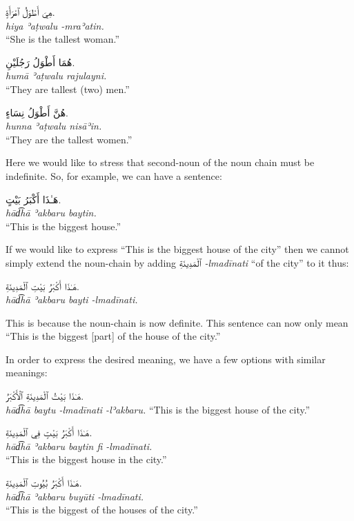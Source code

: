 \documentclass[
  10pt,
]{book}
\begin{document}
\foreignlanguage{arabic}{هِيَ أَطْوَلُ ٱمْرَأَةٍ.}\\
\emph{hiya ʾaṭwalu -mraʾatin.}\\
\enquote{She is the tallest woman.}

\foreignlanguage{arabic}{هُمَا أَطْوَلُ رَجُلَيْنِ.}\\
\emph{humā ʾaṭwalu rajulayni.}\\
\enquote{They are tallest (two) men.}

\foreignlanguage{arabic}{هُنَّ أَطْوَلُ نِسَاءٍ.}\\
\emph{hunna ʾaṭwalu nisāʾin.}\\
\enquote{They are the tallest women.}

Here we would like to stress that second-noun of the noun chain must be indefinite. So, for example, we can have a sentence:

\foreignlanguage{arabic}{هَـٰذَا أَکْبَرُ بَيْتٍ.}\\
\emph{hād͡hā ʾakbaru baytin.}\\
\enquote{This is the biggest house.}

If we would like to express \enquote{This is the biggest house of the city} then we cannot simply extend the noun-chain by adding \foreignlanguage{arabic}{ٱلْمَدِينَةِ} \emph{-lmadīnati} \enquote{of the city} to it thus:

\foreignlanguage{arabic}{هَـٰذَا أَکْبَرُ بَيْتِ ٱلْمَدِينَةِ.}\\
\emph{hād͡hā ʾakbaru bayti -lmadīnati.}

This is because the noun-chain is now definite. This sentence can now only mean \enquote{This is the biggest {[}part{]} of the house of the city.}

In order to express the desired meaning, we have a few options with similar meanings:

\foreignlanguage{arabic}{هَـٰذَا بَيْتُ ٱلْمَدِينَةِ ٱلْأَکْبَرُ.}\\
\emph{hād͡hā baytu -lmadīnati -lʾakbaru.}
\enquote{This is the biggest house of the city.}

\foreignlanguage{arabic}{هَـٰذَا أَکْبَرُ بَيْتٍ فِي ٱلْمَدِينَةِ.}\\
\emph{hād͡hā ʾakbaru baytin fi -lmadīnati.}\\
\enquote{This is the biggest house in the city.}

\foreignlanguage{arabic}{هَـٰذَا أَکْبَرُ بُيُوتِ ٱلْمَدِينَةِ.}\\
\emph{hād͡hā ʾakbaru buyūti -lmadīnati.}\\
\enquote{This is the biggest of the houses of the city.}
\end{document}
